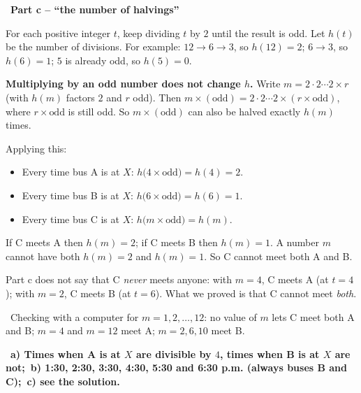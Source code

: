 \documentclass[11pt]{article}
\providecommand{\AnsWord}{Đáp số}
\newcommand{\ans}[1]{\par\smallskip{\bfseries\color{tmGreen!88!black}\AnsWord:}\ {\bfseries\color{AnsRed}#1}\par}
\newcommand{\step}[2]{\par\smallskip\noindent{\bfseries\color{tmBlue!85!black}\StepWord~#1.}\ {\bfseries #2}\par\nopagebreak}
\newcommand{\verify}[1]{\par\smallskip\noindent{\bfseries\color{tmGreen!80!black}\faCheckCircle\ \CheckWord}\ #1\par}
\def\AnsWord{Answer}
\def\StepWord{Step}
\def\CheckWord{Check:}
\begin{document}
{\step{3}{Part c -- ``the number of halvings''}
For each positive integer $t$, keep dividing $t$ by $2$ until the result is odd. Let $h(t)$ be the number of divisions. For example: $12\to 6\to 3$, so $h(12)=2$; $6\to3$, so $h(6)=1$; $5$ is already odd, so $h(5)=0$.
\begin{proofbox}\textbf{Multiplying by an odd number does not change $h$.} Write $m=2\cdot2\cdots2\times r$ (with $h(m)$ factors $2$ and $r$ odd). Then $m\times(\text{odd})=2\cdot2\cdots2\times(r\times\text{odd})$, where $r\times\text{odd}$ is still odd. So $m\times(\text{odd})$ can also be halved exactly $h(m)$ times.\end{proofbox}
Applying this:
\begin{itemize}[leftmargin=1.3em,itemsep=1pt]
\item Every time bus A is at $X$: $h\big(4\times\text{odd}\big)=h(4)=2$.
\item Every time bus B is at $X$: $h\big(6\times\text{odd}\big)=h(6)=1$.
\item Every time bus C is at $X$: $h\big(m\times\text{odd}\big)=h(m)$.
\end{itemize}
If C meets A then $h(m)=2$; if C meets B then $h(m)=1$. A number $m$ cannot have both $h(m)=2$ and $h(m)=1$. So C cannot meet both A and B.
\begin{warnbox}Part c does not say that C \emph{never} meets anyone: with $m=4$, C meets A (at $t=4$); with $m=2$, C meets B (at $t=6$). What we proved is that C cannot meet \emph{both}.\end{warnbox}
\verify{Checking with a computer for $m=1,2,\dots,12$: no value of $m$ lets C meet both A and B; $m=4$ and $m=12$ meet A; $m=2,6,10$ meet B.}
\ans{a) Times when A is at $X$ are divisible by $4$, times when B is at $X$ are not;\ b) 1:30, 2:30, 3:30, 4:30, 5:30 and 6:30 p.m. (always buses B and C);\ c) see the solution.}
}
\end{document}
